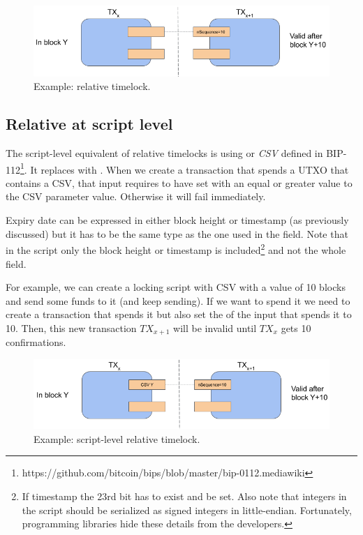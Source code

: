\vspace{0.5em}
\begin{figure}[H]
\begin{center}
\includegraphics[scale=0.6]{images/relative-timelock}
\caption{Example: relative timelock.}
\label{fig:relative-timelock}
\end{center}
\end{figure}


\subsection*{Relative at script level}
The script-level equivalent of relative timelocks is using  or \emph{CSV} defined in BIP-112\footnote{https://github.com/bitcoin/bips/blob/master/bip-0112.mediawiki}. It replaces  with . When we create a transaction that spends a UTXO that contains a CSV, that input requires to have  set with an equal or greater value to the CSV parameter value. Otherwise it will fail immediately.

Expiry date can be expressed in either block height or timestamp (as previously discussed) but it has to be the same type as the one used in the  field. Note that in the script only the block height or timestamp is included\footnote{If timestamp the 23rd bit has to exist and be set. Also note that integers in the script should be serialized as signed integers in little-endian. Fortunately, programming libraries hide these details from the developers.} and not the whole  field.

For example, we can create a locking script with CSV with a value of 10 blocks and send some funds to it (and keep sending). If we want to spend it we need to create a transaction that spends it but also set the  of the input that spends it to 10. Then, this new transaction $TX_{x+1}$ will be invalid until $TX_{x}$ gets 10 confirmations.

\vspace{0.5em}
\begin{figure}[H]
\begin{center}
\includegraphics[scale=0.6]{images/script-relative-timelock}
\caption{Example: script-level relative timelock.}
\label{fig:script-relative-timelock}
\end{center}
\end{figure}


